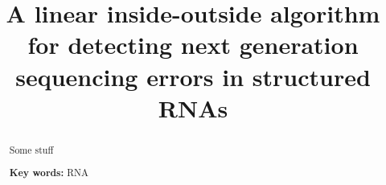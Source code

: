 \documentclass[11pt]{article}
\title{A linear inside-outside algorithm for detecting next generation sequencing errors in structured RNAs}
\author{}
\date{}
\begin{document}
\maketitle
\begin{abstract}
Some stuff~\cite{Waldispuhl2008}

\noindent
\textbf{Key words:} RNA
\end{abstract}

\newpage











\newpage



\end{document}
